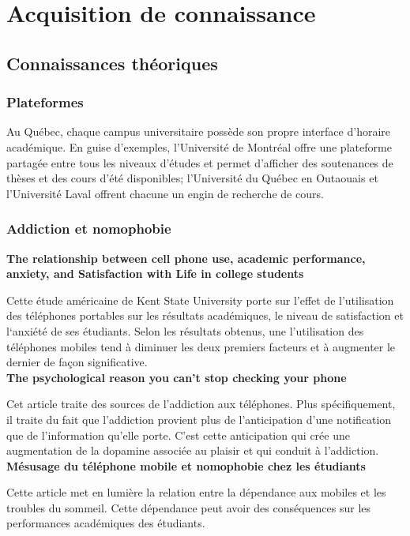 \section{Acquisition de connaissance}

	\subsection{Connaissances théoriques}
		\subsubsection{Plateformes}
		Au Québec, chaque campus universitaire possède son propre interface d'horaire académique. En guise d'exemples, l'Université de Montréal offre une plateforme partagée entre tous les niveaux d'études et permet d'afficher des soutenances de thèses et des cours d'été disponibles; l'Université du Québec en Outaouais et l'Université Laval offrent chacune un engin de recherche de cours.
		
		\subsubsection{Addiction et nomophobie}
		
		{\bfseries The relationship between cell phone use, academic performance, anxiety, and Satisfaction with Life in college students}	
		
		Cette étude américaine de Kent State University porte sur l'effet de l'utilisation des téléphones portables sur les résultats académiques, le niveau de satisfaction et l‘anxiété de ses étudiants. Selon les résultats obtenus, une l'utilisation des téléphones mobiles tend à diminuer les deux premiers facteurs et à augmenter le dernier de façon significative. \\
		
		{\bfseries The psychological reason you can't stop checking your phone}
		
		Cet article traite des sources de l'addiction aux téléphones. Plus spécifiquement, il traite du fait que l'addiction provient plus de l'anticipation d'une notification que de l'information qu'elle porte. C'est cette anticipation qui crée une augmentation de la dopamine associée au plaisir et qui conduit à l'addiction. \\
		
		{\bfseries Mésusage du téléphone mobile et nomophobie chez les étudiants}
		
		Cette article met en lumière la relation entre la dépendance aux mobiles et les troubles du sommeil. Cette dépendance peut avoir des conséquences sur les performances académiques des étudiants.
				
